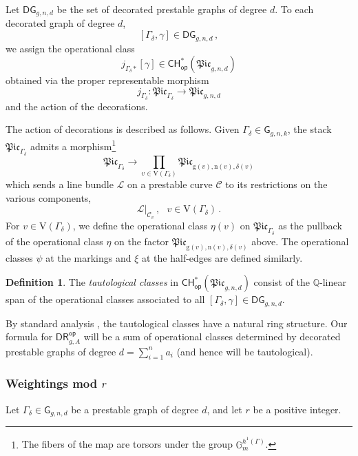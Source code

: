 \documentclass[a4paper,12pt]{article} %
\def\D{\mathrm{D}}
\def\n{\mathrm{n}}
\def\V{\mathrm{V}}
\def\g{\mathrm{g}}
\def\G{\mathsf{G}}
\def\D{\mathsf{D}}
\theoremstyle{definition}
\newtheorem{definition}{Definition} %
\theoremstyle{plain}%
\newcommand{\Picabs}{\mathfrak{Pic}}
\begin{document}
Let $\D\G_{g,n,d}$ be the set of decorated prestable graphs of degree $d$.
To each decorated graph of degree $d$, 
$$[\Gamma_\delta,\gamma]\in \D\G_{g,n,d}\,,$$ we assign the 
operational class 
$$j_{\Gamma_\delta*}[\gamma] \in \mathsf{CH}^*_{\mathsf{op}}(\Picabs_{g,n,d})$$
obtained
via the proper representable morphism
$$j_{\Gamma_\delta} : \Picabs_{\Gamma_\delta} \rightarrow \Picabs_{g,n,d}$$
and the action of the decorations.

The action of decorations is described
as follows.
Given $\Gamma_\delta\in \mathsf{G}_{g,n,k}$, the stack $\Picabs_{\Gamma_\delta}$ admits a morphism{\footnote{The fibers of the map are torsors under the group $\mathbb{G}_m^{h^1(\Gamma)}$.}}
\[\Picabs_{\Gamma_\delta} \to \prod_{v \in \V(\Gamma_\delta)} \Picabs_{\g(v),\n(v),\delta(v)}\]
which sends a line bundle $\mathcal{L}$ on a prestable curve $\mathcal{C}$ to its restrictions on the various components,
$$ \mathcal{L}|_{\mathcal{C}_v}\, , \  \ \  v\in \V(\Gamma_\delta)\, . $$
For $v \in \V(\Gamma_\delta)$, we define the operational
class $\eta(v)$ on $\Picabs_{\Gamma_\delta}$ as the pullback of the operational class $\eta$ on the factor $\Picabs_{\g(v),\n(v),\delta(v)}$ above. The operational
classes $\psi$ at the markings and $\xi$ at the half-edges are
defined similarly.




\begin{definition} The {\em tautological  classes} in
 $\mathsf{CH}^*_{\mathsf{op}}(\Picabs_{g,n,d})$ consist of the 
 $\mathbb{Q}$-linear span
 of the operational classes associated to 
 all $[\Gamma_\delta,\gamma]\in \D\G_{g,n,d}$.
\end{definition}

By standard analysis \cite{GraberPandharipande}, the tautological classes
have a natural ring structure.
Our formula for $\mathsf{DR}_{g,A}^{\mathsf{op}}$ 
will be a sum of operational classes
determined by decorated prestable graphs of degree $d=\sum_{i=1}^n a_i$
(and hence will be tautological).

\subsubsection{Weightings mod \texorpdfstring{$r$}{r}} \label{Ssec:weightings}
Let $\Gamma_\delta\in \G_{g,n,d}$ be a prestable graph of degree $d$, and
let $r$ be a positive integer.
\end{document}
